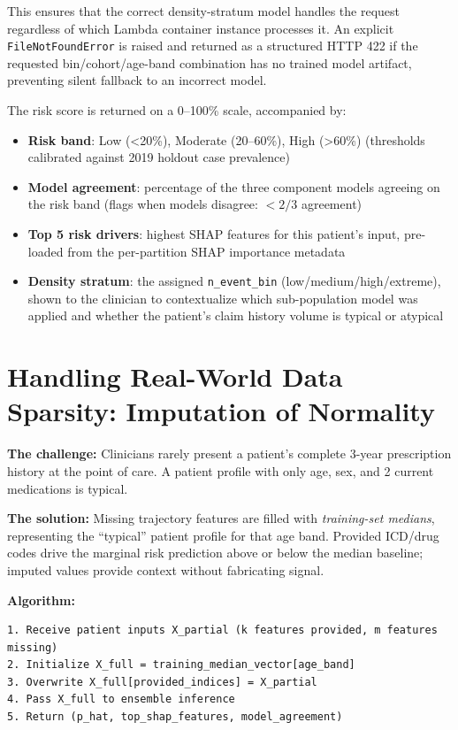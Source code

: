 \documentclass[
  12pt,
]{book}
\providecommand{\tightlist}{%
  \setlength{\itemsep}{0pt}\setlength{\parskip}{0pt}}
\begin{document}
This ensures that the correct density-stratum model handles the request
regardless of which Lambda container instance processes it. An explicit
\texttt{FileNotFoundError} is raised and returned as a structured HTTP
422 if the requested bin/cohort/age-band combination has no trained
model artifact, preventing silent fallback to an incorrect model.

The risk score is returned on a 0--100\% scale, accompanied by:

\begin{itemize}
\tightlist
\item
  \textbf{Risk band}: Low (\textless20\%), Moderate (20--60\%), High
  (\textgreater60\%) (thresholds calibrated against 2019 holdout case
  prevalence)
\item
  \textbf{Model agreement}: percentage of the three component models
  agreeing on the risk band (flags when models disagree: \(< 2/3\)
  agreement)
\item
  \textbf{Top 5 risk drivers}: highest SHAP features for this patient's
  input, pre-loaded from the per-partition SHAP importance metadata
\item
  \textbf{Density stratum}: the assigned \texttt{n\_event\_bin}
  (low/medium/high/extreme), shown to the clinician to contextualize
  which sub-population model was applied and whether the patient's claim
  history volume is typical or atypical
\end{itemize}

\section{Handling Real-World Data Sparsity: Imputation of
Normality}\label{sec-imputation}

\textbf{The challenge:} Clinicians rarely present a patient's complete
3-year prescription history at the point of care. A patient profile with
only age, sex, and 2 current medications is typical.

\textbf{The solution:} Missing trajectory features are filled with
\emph{training-set medians}, representing the ``typical'' patient
profile for that age band. Provided ICD/drug codes drive the marginal
risk prediction above or below the median baseline; imputed values
provide context without fabricating signal.

\textbf{Algorithm:}

\begin{verbatim}
1. Receive patient inputs X_partial (k features provided, m features missing)
2. Initialize X_full = training_median_vector[age_band]
3. Overwrite X_full[provided_indices] = X_partial
4. Pass X_full to ensemble inference
5. Return (p_hat, top_shap_features, model_agreement)
\end{verbatim}
\end{document}

